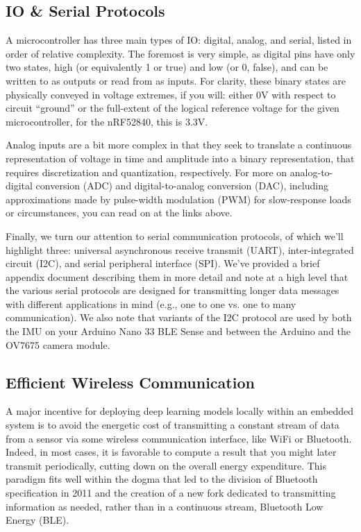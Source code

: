 \subsection{IO \& Serial Protocols}

    A microcontroller has three main types of IO: digital, analog, and serial, listed in order of relative complexity. The foremost is very simple, as digital pins have only two states, high (or equivalently 1 or true) and low (or 0, false), and can be written to as outputs or read from as inputs. For clarity, these binary states are physically conveyed in voltage extremes, if you will: either 0V with respect to circuit “ground” or the full-extent of the logical reference voltage for the given microcontroller, for the nRF52840, this is 3.3V.
    
    Analog inputs are a bit more complex in that they seek to translate a continuous representation of voltage in time and amplitude into a binary representation, that requires discretization and quantization, respectively. For more on analog-to-digital conversion (ADC) and digital-to-analog conversion (DAC), including approximations made by pulse-width modulation (PWM) for slow-response loads or circumstances, you can read on at the links above.
    
    Finally, we turn our attention to serial communication protocols, of which we’ll highlight three: universal asynchronous receive transmit (UART), inter-integrated circuit (I2C), and serial peripheral interface (SPI). We’ve provided a brief appendix document describing them in more detail and note at a high level that the various serial protocols are designed for transmitting longer data messages with different applications in mind (e.g., one to one vs. one to many communication). We also note that variants of the I2C protocol are used by both the IMU on your Arduino Nano 33 BLE Sense and between the Arduino and the OV7675 camera module.
    
\subsection{Efficient Wireless Communication}

    A major incentive for deploying deep learning models locally within an embedded system is to avoid the energetic cost of transmitting a constant stream of data from a sensor via some wireless communication interface, like WiFi or Bluetooth. Indeed, in most cases, it is favorable to compute a result that you might later transmit periodically, cutting down on the overall energy expenditure. This paradigm fits well within the dogma that led to the division of Bluetooth specification in 2011 and the creation of a new fork dedicated to transmitting information as needed, rather than in a continuous stream, Bluetooth Low Energy (BLE).
    
